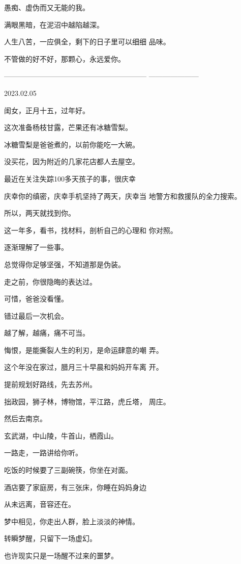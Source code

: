 \documentclass{article}
\begin{document}
愚痴、虚伪而又无能的我。 


满眼黑暗，在泥沼中越陷越深。 

人生八苦，一应俱全，剩下的日子里可以细细
品味。 



不管做的好不好，那颗心，永远爱你。 

————————————————————
——————— 


2023.02.05 


闺女，正月十五，过年好。 


这次准备杨枝甘露，芒果还有冰糖雪梨。 


\newpage

冰糖雪梨是爸爸煮的，以前你能吃一大碗。 


没买花，因为附近的几家花店都人去屋空。 

最近在关注失踪100多天孩子的事，很庆幸

庆幸你的缜密，庆幸手机坚持了两天，庆幸当
地警方和救援队的全力搜索。 


所以，两天就找到你。 

这一年多，看书，找材料，剖析自己的心理和
你对照。 


逐渐理解了一些事。 


总觉得你足够坚强，不知道那是伪装。 


走之前，你很隐晦的表达过。 


可惜，爸爸没看懂。 

\newpage


错过最后一次机会。 


越了解，越痛，痛不可当。 

悔恨，是能撕裂人生的利刃，是命运肆意的嘲
弄。 

这个年没在家过，腊月三十早晨和妈妈开车离
开。 


提前规划好路线，先去苏州。 

拙政园，狮子林，博物馆，平江路，虎丘塔，
周庄。 


然后去南京。 


玄武湖，中山陵，牛首山，栖霞山。 


一路走，一路讲给你听。 

\newpage


吃饭的时候要了三副碗筷，你坐在对面。 

酒店要了家庭房，有三张床，你睡在妈妈身边


从未远离，音容还在。 


梦中相见，你走出人群，脸上淡淡的神情。 


转瞬梦醒，只留下一场虚幻。 


也许现实只是一场醒不过来的噩梦。 
\end{document}
